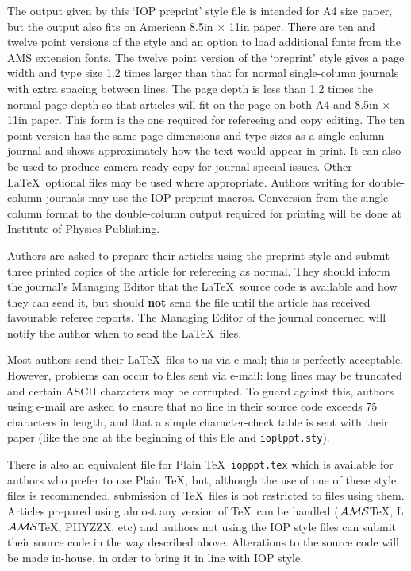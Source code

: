 The output given by this `IOP preprint' style file is intended for A4 size
paper, but the output also fits on American 8.5\;in $\times$ 11\;in
paper.
There are ten and twelve point versions of the style and an option to load
additional fonts from the AMS extension fonts. The twelve point version
of the `preprint' style gives a page width and type size
1.2 times larger than that for normal single-column journals
with extra spacing between lines. The page depth is less than 1.2 times
the normal page depth so that articles will fit on the page on both
A4 and 8.5\;in $\times$ 11\;in paper.
This form is the one required for
refereeing and copy editing.
The ten point version has the same page dimensions and type sizes as a
single-column journal and shows approximately
how the text would appear in print. It can also be used to produce
camera-ready
copy for journal special issues.
Other \LaTeX\ optional files may be used where appropriate.
Authors writing for double-column journals may use the IOP preprint
macros. Conversion from the single-column format to the double-column
output required for printing will be done at Institute of Physics
Publishing.


Authors are asked to prepare their articles using the preprint style
and submit three printed copies of the article for refereeing as
normal.  They should inform the journal's Managing Editor that the
\LaTeX\ source
code is available and how they can send it, but should {\bf not} send
the file until the article has received favourable referee reports.
The Managing Editor of the journal concerned
will notify the author when to send the \LaTeX\ files.

Most authors send their \LaTeX\ files to us via e-mail; this is
perfectly acceptable. However, problems can occur to files sent via
e-mail: long lines may be truncated and certain ASCII characters may
be corrupted. To guard against this, authors using e-mail are asked to
ensure that no line in their source code exceeds 75 characters in
length, and that a simple character-check table is sent with their
paper (like the one at the beginning of this file and
\verb"ioplppt.sty").


There is also an equivalent file for Plain \TeX\ \verb"iopppt.tex" which
is available for authors who prefer to use Plain \TeX, but,
although the use of one of these style files is recommended,
submission of \TeX\ files is not restricted to files using them.
Articles prepared using almost any  version of \TeX\ can be
handled (${\cal AMS}$\TeX, L${\cal AMS}$TeX, PHYZZX, etc)
and authors not using the IOP
style files
can submit their source code in the way described
above. Alterations to the source code will be made in-house, in order
to bring it in line with IOP style.

